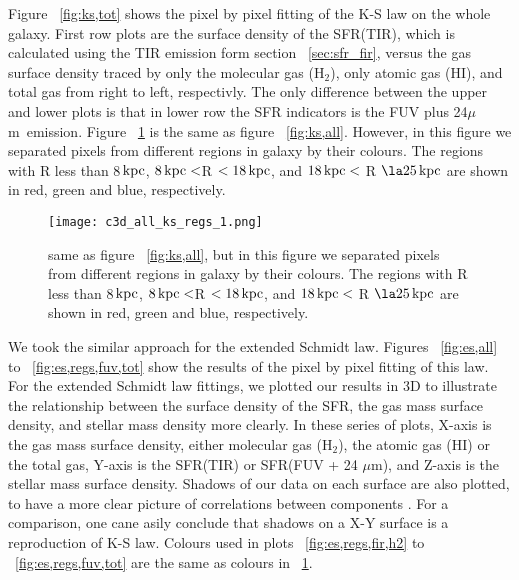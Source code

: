 \documentclass[useAMS,usenatbib]{mn2e}
\newcommand \kpc        {\,{\rm kpc}}
\newcommand \um    {$\mu$m\ }
\begin{document}
Figure ~\ref{fig:ks,tot} shows the pixel by pixel fitting of the K-S law on the whole galaxy. First row plots are the surface density of the SFR(TIR), which is calculated using  the TIR emission form section ~\ref{sec:sfr_fir}, versus the gas surface density traced by only the molecular gas (H$_2$),  only atomic gas (HI), and total gas from right to left, respectivly. The only difference between the upper and lower plots is that in lower row the SFR indicators is the FUV plus 24\um emission. Figure ~\ref{fig:ks,regs} is the same as figure ~\ref{fig:ks,all}. However, in this figure we separated pixels from different regions in galaxy by their colours. The regions with R less than 8$\kpc$, $8\kpc < $R $< 18\kpc$, and $18\kpc <$ R $\la 25\kpc$ are shown in red, green and blue, respectively. 


\begin{figure*}
\texttt{[image: c3d\_all\_ks\_regs\_1.png]}
\caption{same as figure ~\ref{fig:ks,all}, but in this figure we separated pixels from different regions in galaxy by their colours. The regions with R less than 8$\kpc$, $8\kpc < $R $< 18\kpc$, and $18\kpc <$ R $\la 25\kpc$ are shown in red, green and blue, respectively.}
\label{fig:ks,regs}
\end{figure*}


We took the similar approach for the extended Schmidt law. Figures ~\ref{fig:es,all} to ~\ref{fig:es,regs,fuv,tot} show the results of the pixel by pixel fitting of this law. For the extended Schmidt law fittings, we plotted our results in 3D to illustrate the relationship between the surface density of the SFR, the gas mass surface density, and stellar mass density more clearly. In these series of plots, X-axis is the gas mass  surface density, either molecular gas (H$_2$), the atomic gas (HI) or the total gas, Y-axis is the SFR(TIR) or SFR(FUV + 24 $\mu$m), and Z-axis is the stellar mass surface density. Shadows of our data on each surface are also plotted, to have a more clear picture of correlations between components . For a comparison, one cane asily conclude that shadows on a X-Y surface is a reproduction of K-S law. Colours used in plots ~\ref{fig:es,regs,fir,h2} to ~\ref{fig:es,regs,fuv,tot} are the same as colours in  ~\ref{fig:ks,regs}.






\end{document}

